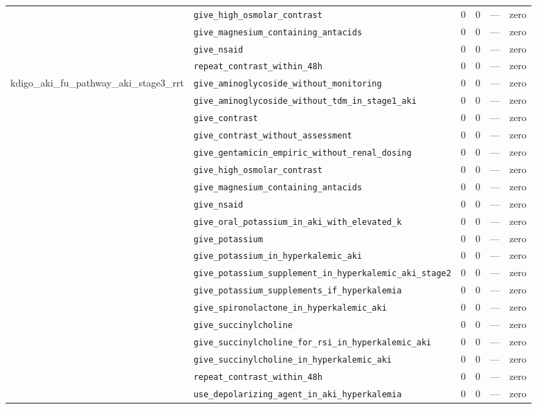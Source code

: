 \begin{table}[ht]
\begin{tabular}{llrrrl}
 & \texttt{give\_high\_osmolar\_contrast} & 0 & 0 & — & zero \\
 & \texttt{give\_magnesium\_containing\_antacids} & 0 & 0 & — & zero \\
 & \texttt{give\_nsaid} & 0 & 0 & — & zero \\
 & \texttt{repeat\_contrast\_within\_48h} & 0 & 0 & — & zero \\
\midrule
kdigo\_aki\_fu\_pathway\_aki\_stage3\_rrt & \texttt{give\_aminoglycoside\_without\_monitoring} & 0 & 0 & — & zero \\
 & \texttt{give\_aminoglycoside\_without\_tdm\_in\_stage1\_aki} & 0 & 0 & — & zero \\
 & \texttt{give\_contrast} & 0 & 0 & — & zero \\
 & \texttt{give\_contrast\_without\_assessment} & 0 & 0 & — & zero \\
 & \texttt{give\_gentamicin\_empiric\_without\_renal\_dosing} & 0 & 0 & — & zero \\
 & \texttt{give\_high\_osmolar\_contrast} & 0 & 0 & — & zero \\
 & \texttt{give\_magnesium\_containing\_antacids} & 0 & 0 & — & zero \\
 & \texttt{give\_nsaid} & 0 & 0 & — & zero \\
 & \texttt{give\_oral\_potassium\_in\_aki\_with\_elevated\_k} & 0 & 0 & — & zero \\
 & \texttt{give\_potassium} & 0 & 0 & — & zero \\
 & \texttt{give\_potassium\_in\_hyperkalemic\_aki} & 0 & 0 & — & zero \\
 & \texttt{give\_potassium\_supplement\_in\_hyperkalemic\_aki\_stage2} & 0 & 0 & — & zero \\
 & \texttt{give\_potassium\_supplements\_if\_hyperkalemia} & 0 & 0 & — & zero \\
 & \texttt{give\_spironolactone\_in\_hyperkalemic\_aki} & 0 & 0 & — & zero \\
 & \texttt{give\_succinylcholine} & 0 & 0 & — & zero \\
 & \texttt{give\_succinylcholine\_for\_rsi\_in\_hyperkalemic\_aki} & 0 & 0 & — & zero \\
 & \texttt{give\_succinylcholine\_in\_hyperkalemic\_aki} & 0 & 0 & — & zero \\
 & \texttt{repeat\_contrast\_within\_48h} & 0 & 0 & — & zero \\
 & \texttt{use\_depolarizing\_agent\_in\_aki\_hyperkalemia} & 0 & 0 & — & zero \\
\midrule

\end{tabular}
\end{table}
